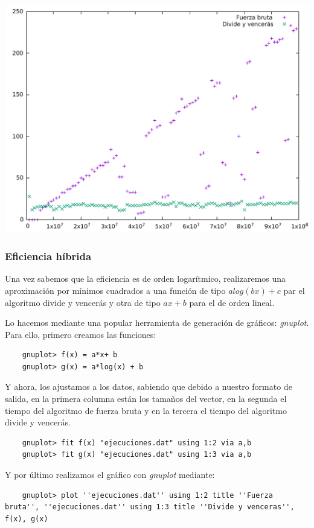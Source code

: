 \documentclass[a4paper, 11pt]{article}
\begin{document}
\begin{center}
	\includegraphics[scale=0.5]{imagen1.pdf}
\end{center}

\subsubsection{Eficiencia híbrida}
Una vez sabemos que la eficiencia es de orden logarítmico, realizaremos una aproximación por mínimos cuadrados a una función de tipo $alog(bx) + c$ par el algoritmo divide y vencerás y otra de tipo $ax + b$ para el de orden lineal.

Lo hacemos mediante una popular herramienta de generación de gráficos: \emph{gnuplot}.
Para ello, primero creamos las funciones:
\begin{lstlisting}
	gnuplot> f(x) = a*x+ b
	gnuplot> g(x) = a*log(x) + b
\end{lstlisting}

Y ahora, los ajustamos a los datos, sabiendo que debido a nuestro formato de salida, en la primera columna están los tamaños del vector, en la segunda el tiempo del algoritmo de fuerza bruta y en la tercera el tiempo del algoritmo divide y vencerás.

\begin{lstlisting}
	gnuplot> fit f(x) "ejecuciones.dat" using 1:2 via a,b
	gnuplot> fit g(x) "ejecuciones.dat" using 1:3 via a,b
\end{lstlisting}

Y por último realizamos el gráfico con \emph{gnuplot} mediante:
\begin{lstlisting}
	gnuplot> plot ''ejecuciones.dat'' using 1:2 title ''Fuerza bruta'', ''ejecuciones.dat'' using 1:3 title ''Divide y venceras'', f(x), g(x)
\end{lstlisting}
\end{document}
